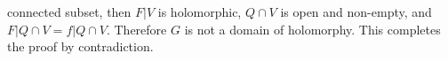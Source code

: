 connected subset, then $F|V$ is holomorphic, $Q \cap V$ is open and non-empty, and $F|Q \cap V = f|Q \cap V$. Therefore $G$ is not a domain of holomorphy. This completes the proof by contradiction.
